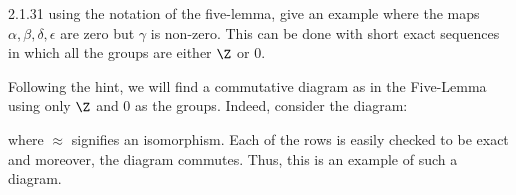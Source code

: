 \documentclass{article}
\begin{document}
\begin{exercise}{2.1.31}{\parindent}
  using the notation of the five-lemma, give an example where the maps
  $\alpha, \beta, \delta, \epsilon$ are zero but $\gamma$ is
  non-zero. This can be done with short exact sequences in which all
  the groups are either $\Z$ or 0.
\end{exercise}
\begin{solution}{\parindent}
  Following the hint, we will find a commutative diagram as in the
  Five-Lemma using only $\Z$ and 0 as the groups. Indeed, consider the
  diagram:
  \begin{center}
  \end{center}
  where $\approx$ signifies an isomorphism. Each of the rows is easily
  checked to be exact and moreover, the diagram commutes. Thus, this
  is an example of such a diagram.
\end{solution}
\end{document}
